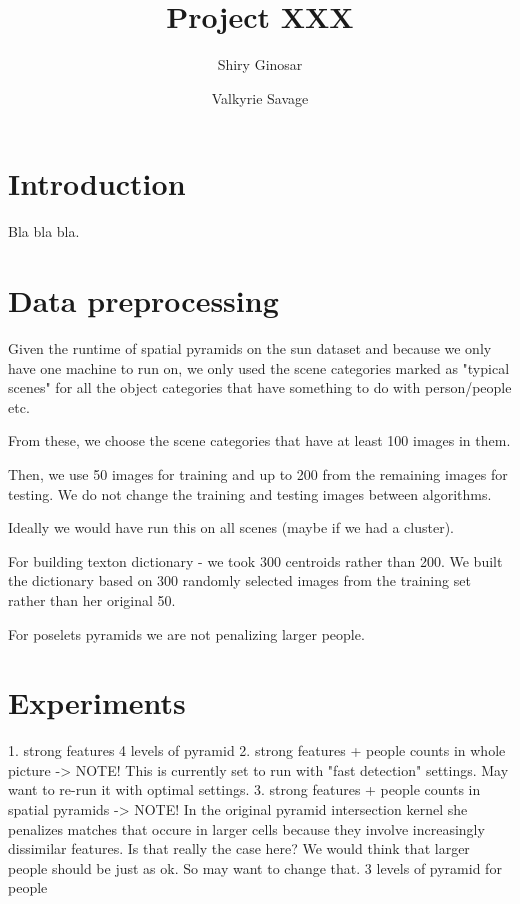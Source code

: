 \documentclass[11pt]{article}
\begin{document}
\title{Project XXX}
\author{Shiry Ginosar \and Valkyrie Savage}

\maketitle


\section{Introduction}
Bla bla bla.

\section{Data preprocessing}
Given the runtime of spatial pyramids on the sun dataset and because we only have one machine to run on, we only used the scene categories marked as "typical scenes" for all the object categories that have something to do with person/people etc.

From these, we choose the scene categories that have at least 100 images in them.

Then, we use 50 images for training and up to 200 from the remaining images for testing. We do not change the training and testing images between algorithms.

Ideally we would have run this on all scenes (maybe if we had a cluster).

For building texton dictionary - we took 300 centroids rather than 200. We built the dictionary based on 300 randomly selected images from the training set rather than her original 50.

For poselets pyramids we are not penalizing larger people.

\section{Experiments}
1. strong features 4 levels of pyramid
2. strong features + people counts in whole picture -> NOTE! This is currently set to run with "fast detection" settings. May want to re-run it with optimal settings.
3. strong features + people counts in spatial pyramids -> NOTE! In the original pyramid intersection kernel she penalizes matches that occure in larger cells because they involve increasingly dissimilar features. Is that really the case here? We would think that larger people should be just as ok. So may want to change that.
3 levels of pyramid for people



\end{document}
